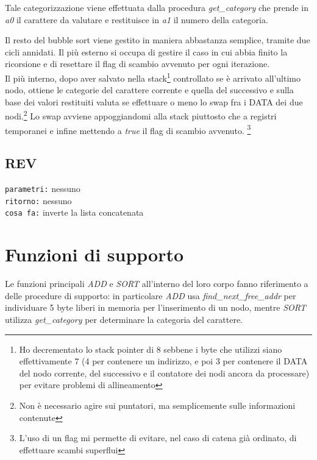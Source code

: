 \documentclass[11pt]{report}
\begin{document}
{\begin{mdframed}
    \end{mdframed}
    Tale categorizzazione viene effettuata dalla procedura \textit{get\_category} che prende in \textit{a0} il carattere da valutare e restituisce in \textit{a1} il numero della categoria.

    Il resto del bubble sort viene gestito in maniera abbastanza semplice, tramite due cicli annidati. Il più esterno si occupa di gestire il caso in cui abbia finito la ricorsione e di resettare il flag di scambio avvenuto per ogni iterazione.\\
    Il più interno, dopo aver salvato nella stack\footnote[1]{Ho decrementato lo stack pointer di 8 sebbene i byte che utilizzi siano effettivamente 7 (4 per contenere un indirizzo, e poi 3 per contenere il DATA del nodo corrente, del successivo e il contatore dei nodi ancora da processare) per evitare problemi di allineamento} controllato se è arrivato all'ultimo nodo, ottiene le categorie del carattere corrente e quella del successivo e sulla base dei valori restituiti valuta se effettuare o meno lo swap fra i DATA dei due nodi.\footnote[2]{Non è necessario agire sui puntatori, ma semplicemente sulle informazioni contenute}
    Lo swap avviene appoggiandomi alla stack piuttosto che a registri temporanei e infine mettendo a \textit{true} il flag di scambio avvenuto. \footnote[3]{L'uso di un flag mi permette di evitare, nel caso di catena già ordinato, di effettuare scambi superflui}
    }
    
    \subsection{REV}
    \begin{mdframed}
            \texttt{parametri:} nessuno \\
             \texttt{ritorno:} nessuno \\
             \texttt{cosa fa:} inverte la lista concatenata
        \end{mdframed}
    


    \section{Funzioni di supporto}
    Le funzioni principali \textit{ADD} e \textit{SORT} all'interno del loro corpo fanno riferimento a delle procedure di supporto: in particolare \textit{ADD} usa \textit{find\_next\_free\_addr} per individuare 5 byte liberi in memoria per l'inserimento di un nodo, mentre \textit{SORT} utilizza \textit{get\_category} per determinare la categoria del carattere.
\end{document}
